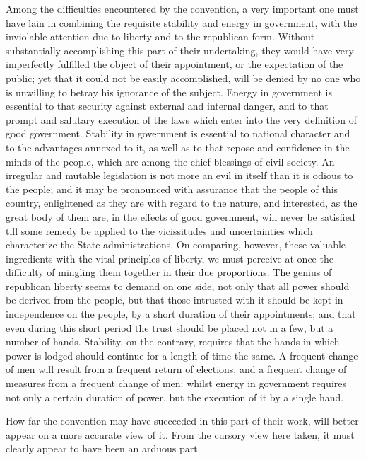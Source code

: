 Among the difficulties encountered by the convention, a very important one must have lain in combining the requisite stability and energy in government, with the inviolable attention due to liberty and to the republican form. 
Without substantially accomplishing this part of their undertaking, they would have very imperfectly fulfilled the object of their appointment, or the expectation of the public; yet that it could not be easily accomplished, will be denied by no one who is unwilling to betray his ignorance of the subject. 
Energy in government is essential to that security against external and internal danger, and to that prompt and salutary execution of the laws which enter into the very definition of good government. 
Stability in government is essential to national character and to the advantages annexed to it, as well as to that repose and confidence in the minds of the people, which are among the chief blessings of civil society. 
An irregular and mutable legislation is not more an evil in itself than it is odious to the people; and it may be pronounced with assurance that the people of this country, enlightened as they are with regard to the nature, and interested, as the great body of them are, in the effects of good government, will never be satisfied till some remedy be applied to the vicissitudes and uncertainties which characterize the State administrations. 
On comparing, however, these valuable ingredients with the vital principles of liberty, we must perceive at once the difficulty of mingling them together in their due proportions. 
The genius of republican liberty seems to demand on one side, not only that all power should be derived from the people, but that those intrusted with it should be kept in independence on the people, by a short duration of their appointments; and that even during this short period the trust should be placed not in a few, but a number of hands. 
Stability, on the contrary, requires that the hands in which power is lodged should continue for a length of time the same. 
A frequent change of men will result from a frequent return of elections; and a frequent change of measures from a frequent change of men: whilst energy in government requires not only a certain duration of power, but the execution of it by a single hand.

How far the convention may have succeeded in this part of their work, will better appear on a more accurate view of it. 
From the cursory view here taken, it must clearly appear to have been an arduous part.

